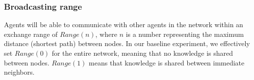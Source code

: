 \subsubsection{Broadcasting range}\label{ssec:range}
Agents will be able to communicate with other agents in the network within an exchange range of \( Range(n) \), where \(n\) is a number representing the maximum distance (shortest path) between nodes. In our baseline experiment, we effectively set \( Range(0) \) for the entire network, meaning that no knowledge is shared between nodes. \( Range(1) \) means that knowledge is shared between immediate neighbors. 


